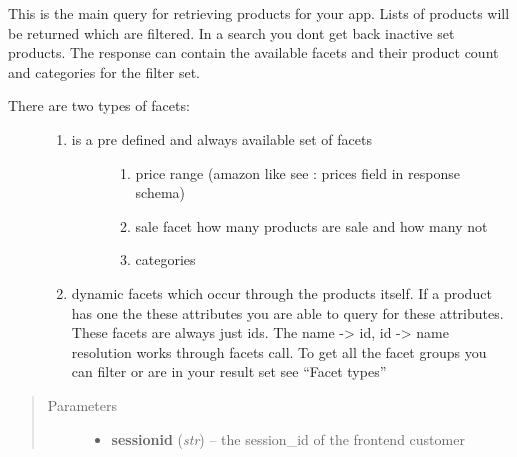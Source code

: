 \documentclass[letterpaper,10pt,english]{sphinxmanual}
\begin{document}
\begin{fulllineitems}
\begin{fulllineitems}
\end{fulllineitems}


\begin{fulllineitems}
\label{collins:collins.Collins.productsearch}
This is the main query for retrieving products for your app.
Lists of products will be returned which are filtered.
In a search you dont get back inactive set products.
The response can contain the available facets and their product count and 
categories for the filter set.
\begin{description}
\item[{There are two types of facets:}] \leavevmode\begin{enumerate}
\item {} \begin{description}
\item[{is a pre defined and always available set of facets}] \leavevmode\begin{enumerate}
\item {} 
price range (amazon like see : prices field in response schema)

\item {} 
sale facet how many products are sale and how many not

\item {} 
categories

\end{enumerate}

\end{description}

\item {} 
dynamic facets which occur through the products itself. If a product has one the these attributes you are able to
query for these attributes. These facets are always just ids. The name -\textgreater{} id, id -\textgreater{} name resolution
works through facets call. To get all the facet groups you can filter or are in your result set see ``Facet types''

\end{enumerate}

\end{description}
\begin{quote}\begin{description}
\item[{Parameters}] \leavevmode\begin{itemize}
\item {} 
\textbf{sessionid} (\emph{str}) -- the session\_id of the frontend customer


\end{itemize}
\end{description}
\end{quote}
\end{fulllineitems}
\end{fulllineitems}
\end{document}
